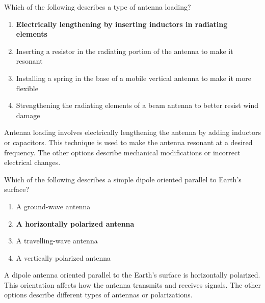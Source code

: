 \begin{tcolorbox}[colback=gray!10!white,colframe=black!75!black,title={T9A02}]
    Which of the following describes a type of antenna loading?
    \begin{enumerate}[label=\Alph*),noitemsep]
        \item \textbf{Electrically lengthening by inserting inductors in radiating elements}
        \item Inserting a resistor in the radiating portion of the antenna to make it resonant
        \item Installing a spring in the base of a mobile vertical antenna to make it more flexible
        \item Strengthening the radiating elements of a beam antenna to better resist wind damage
    \end{enumerate}
\end{tcolorbox}
Antenna loading involves electrically lengthening the antenna by adding inductors or capacitors. This technique is used to make the antenna resonant at a desired frequency. The other options describe mechanical modifications or incorrect electrical changes.


\begin{tcolorbox}[colback=gray!10!white,colframe=black!75!black,title={T9A03}]
    Which of the following describes a simple dipole oriented parallel to Earth's surface?
    \begin{enumerate}[label=\Alph*),noitemsep]
        \item A ground-wave antenna
        \item \textbf{A horizontally polarized antenna}
        \item A travelling-wave antenna
        \item A vertically polarized antenna
    \end{enumerate}
\end{tcolorbox}
A dipole antenna oriented parallel to the Earth's surface is horizontally polarized. This orientation affects how the antenna transmits and receives signals. The other options describe different types of antennas or polarizations.


